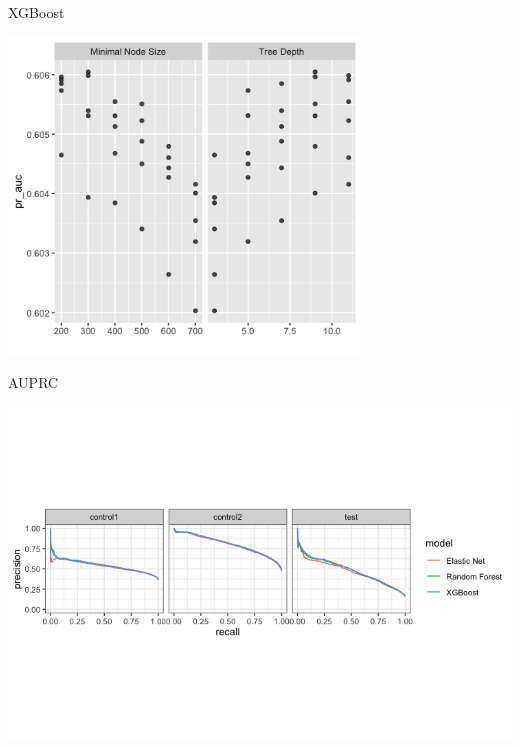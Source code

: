 \documentclass[
  ignorenonframetext,
]{beamer}
\begin{document}
\begin{frame}{XGBoost}
  \begin{center}
    \includegraphics[width=0.7\textwidth]{figure/pdf/xgb_tune1.png}
  \end{center}
\end{frame}


\begin{frame}{AUPRC}
  \begin{center}
    \includegraphics{figure/pdf/R_pr_curve.png}
  \end{center}
\end{frame}
\end{document}

